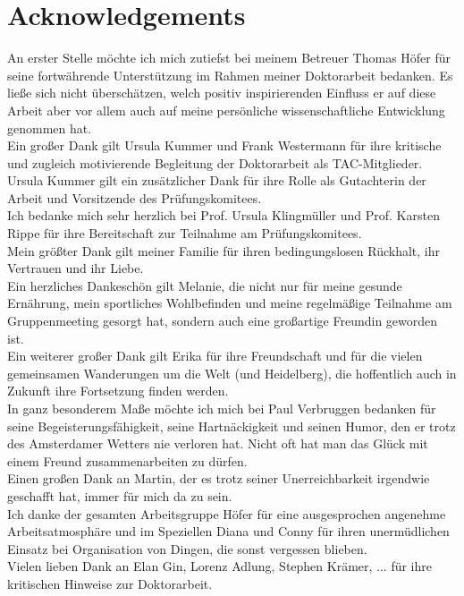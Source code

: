 \chapter*{Acknowledgements}
\thispagestyle{plain2}


An erster Stelle m\"ochte ich mich zutiefst bei meinem Betreuer Thomas H\"ofer f\"ur seine fortw\"ahrende Unterst\"utzung im Rahmen meiner Doktorarbeit  bedanken. Es lie\ss{}e sich nicht \"ubersch\"atzen, welch positiv inspirierenden Einfluss er auf diese Arbeit aber vor allem auch auf meine pers\"onliche wissenschaftliche Entwicklung genommen hat. \\

Ein gro\ss{}er Dank gilt Ursula Kummer und Frank Westermann f\"ur ihre kritische und zugleich motivierende Begleitung der Doktorarbeit als TAC-Mitglieder. Ursula Kummer gilt ein zus\"atzlicher Dank f\"ur ihre Rolle als Gutachterin der Arbeit und Vorsitzende des Pr\"ufungskomitees.\\

Ich bedanke mich sehr herzlich bei Prof. Ursula Klingm\"uller und Prof. Karsten Rippe f\"ur ihre Bereitschaft zur Teilnahme am Pr\"ufungskomitees.\\

Mein gr\"o\ss{}ter Dank gilt meiner Familie f\"{u}r ihren bedingungslosen R\"{u}ckhalt, ihr Vertrauen und ihr Liebe.\\

Ein herzliches Dankesch\"{o}n gilt Melanie, die nicht nur f\"{u}r meine gesunde Ern\"{a}hrung, mein sportliches Wohlbefinden und meine regelm\"{a}\ss{}ige Teilnahme am Gruppenmeeting gesorgt hat, sondern auch eine gro\ss{}artige Freundin geworden ist. \\      

Ein weiterer gro\ss{}er Dank gilt Erika f\"ur ihre Freundschaft und f\"ur die vielen gemeinsamen Wanderungen um die Welt (und Heidelberg), die hoffentlich auch in Zukunft ihre Fortsetzung finden werden.\\

In ganz besonderem Ma\ss{}e m\"{o}chte ich mich bei Paul Verbruggen bedanken f\"ur seine Begeisterungsf\"{a}higkeit, seine Hartn\"{a}ckigkeit und seinen Humor, den er trotz des Amsterdamer Wetters nie verloren hat. Nicht oft hat man das Gl\"{u}ck mit einem Freund zusammenarbeiten zu d\"{u}rfen.\\

Einen gro\ss{}en Dank an Martin, der es trotz seiner Unerreichbarkeit irgendwie geschafft hat, immer f\"{u}r mich da zu sein.\\

Ich danke der gesamten Arbeitsgruppe H\"{o}fer f\"{u}r eine ausgesprochen angenehme Arbeitsatmosph\"{a}re und im Speziellen Diana und Conny f\"ur ihren unerm\"{u}dlichen Einsatz bei Organisation von Dingen, die sonst vergessen blieben.\\

Vielen lieben Dank an Elan Gin, Lorenz Adlung, Stephen Kr\"{a}mer, ... f\"{u}r ihre kritischen Hinweise zur Doktorarbeit.    